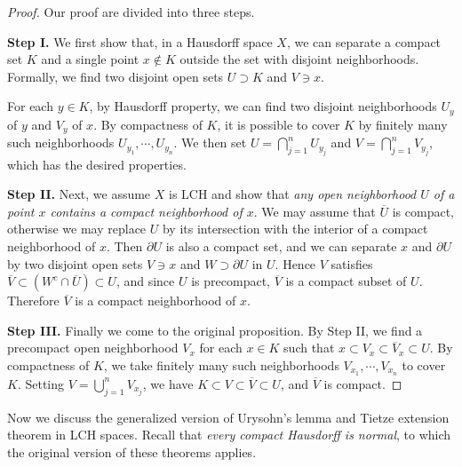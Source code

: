 \documentclass{article}
\numberwithin{equation}{section}
\newcommand{\ol}{\overline}
\theoremstyle{plain}
\theoremstyle{definition}
\begin{document}
\begin{proof} Our proof are divided into three steps.
	
	\item\textbf{Step I.} We first show that, in a Hausdorff space $X$, we can separate a compact set $K$ and a single point $x\notin K$ outside the set with disjoint neighborhoods. Formally, we find two disjoint open sets $U\supset K$ and $V\ni x$. 
	
	For each $y\in K$, by Hausdorff property, we can find two disjoint neighborhoods $U_y$ of $y$ and $V_y$ of $x$. By compactness of $K$, it is possible to cover $K$ by finitely many such neighborhoods $U_{y_1},\cdots,U_{y_n}$. We then set $U=\bigcap_{j=1}^n U_{y_j}$ and $V=\bigcap_{j=1}^n V_{y_j}$, which has the desired properties.
	
	\item\textbf{Step II.} Next, we assume $X$ is LCH and show that \emph{any open neighborhood $U$ of a point $x$ contains a compact neighborhood of $x$}. We may assume that $\ol{U}$ is compact, otherwise we may replace $U$ by its intersection with the interior of a compact neighborhood of $x$. Then $\partial U$ is also a compact set, and we can separate $x$ and $\partial U$ by two disjoint open sets $V\ni x$ and $W\supset\partial U$ in $U$. Hence $V$ satisfies $\ol{V}\subset(W^c\cap\ol{U})\subset U$, and since $U$ is precompact, $\ol{V}$ is a compact subset of $U$. Therefore $\ol{V}$ is a compact neighborhood of $x$.
	
	\item\textbf{Step III.} Finally we come to the original proposition. By Step II, we find a precompact open neighborhood $V_x$ for each $x\in K$ such that $x\subset V_x\subset\ol{V}_x\subset U$. By compactness of $K$, we take finitely many such neighborhoods $V_{x_1},\cdots,V_{x_n}$ to cover $K$. Setting $V=\bigcup_{j=1}^n V_{x_j}$, we have $K\subset V\subset\ol{V}\subset U$, and $\ol{V}$ is compact.
\end{proof}

Now we discuss the generalized version of Urysohn's lemma and Tietze extension theorem in LCH spaces. Recall that \textit{every compact Hausdorff is normal}, to which the original version of these theorems applies.
\end{document}
